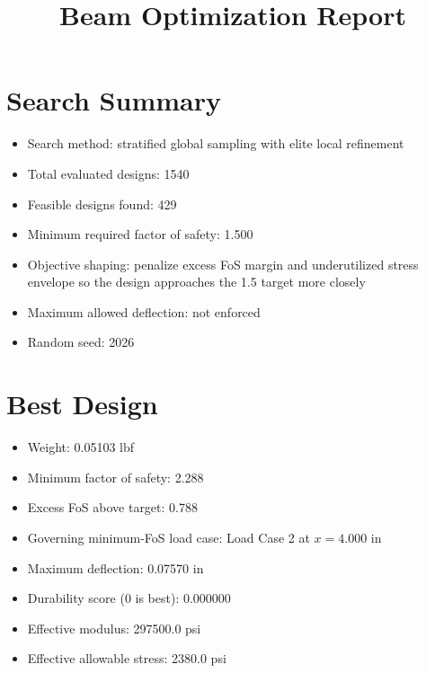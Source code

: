 \documentclass[11pt]{article}
\title{Beam Optimization Report}
\date{}
\begin{document}
\maketitle

\section*{Search Summary}
\begin{itemize}
\item Search method: stratified global sampling with elite local refinement
\item Total evaluated designs: 1540
\item Feasible designs found: 429
\item Minimum required factor of safety: 1.500
\item Objective shaping: penalize excess FoS margin and underutilized stress envelope so the design approaches the 1.5 target more closely
\item Maximum allowed deflection: not enforced
\item Random seed: 2026
\end{itemize}

\section*{Best Design}
\begin{itemize}
\item Weight: 0.05103 lbf
\item Minimum factor of safety: 2.288
\item Excess FoS above target: 0.788
\item Governing minimum-FoS load case: Load Case 2 at $x=4.000$ in
\item Maximum deflection: 0.07570 in
\item Durability score (0 is best): 0.000000
\item Effective modulus: 297500.0 psi
\item Effective allowable stress: 2380.0 psi
\end{itemize}
\end{document}
